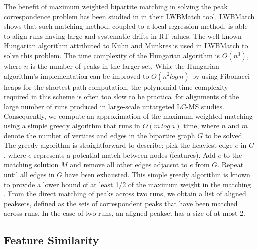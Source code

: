 The benefit of maximum weighted bipartite matching in solving the peak correspondence problem has been studied in \cite{Wang2013} in their LWBMatch tool. LWBMatch shows that such matching method, coupled to a local regression method, is able to align runs having large and systematic drifts in RT values. The well-known Hungarian algorithm \cite{Kuhn1955} attributed to Kuhn and Munkres is used in LWBMatch to solve this problem. The time complexity of the Hungarian algorithm is $O(n^{3})$, where $n$ is the number of peaks in the larger set. While the Hungarian algorithm's implementation can be improved to $O(n^{2}log\, n)$ by using Fibonacci heaps for the shortest path computation, the polynomial time complexity required in this scheme is often too slow to be practical for alignments of the large number of runs produced in large-scale untargeted LC-MS studies. Consequently, we compute an approximation of the maximum weighted matching using a simple greedy algorithm that runs in $O(m\, log\, n)$ time, where $n$ and $m$ denote the number of vertices and edges in the bipartite graph $G$ to be solved. The greedy algorithm is straightforward to describe: pick the heaviest edge $e$ in $G$, where $e$ represents a potential match between nodes (features). Add $e$ to the matching solution $M$ and remove all other edges adjacent to $e$ from $G$. Repeat until all edges in $G$ have been exhausted. This simple greedy algorithm is known to provide a lower bound of at least 1/2 of the maximum weight in the matching \cite{Maximum2011}. From the direct matching of peaks across two runs, we obtain a list of aligned peaksets, defined as the sets of correspondent peaks that have been matched across runs. In the case of two runs, an aligned peakset has a size of at most 2.

\subsection{Feature Similarity}

